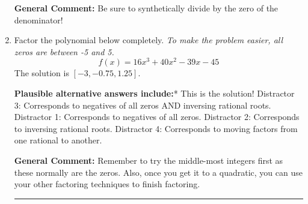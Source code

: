 \documentclass{extbook}[14pt]
\newcommand{\litem}[1]{\item #1

\rule{\textwidth}{0.4pt}}
\begin{document}
\begin{enumerate}
{\textbf{General Comment:} Be sure to synthetically divide by the zero of the denominator!
}
\litem{
Factor the polynomial below completely. \textit{To make the problem easier, all zeros are between -5 and 5.}
\[ f(x) = 16x^{3} +40 x^{2} -39 x -45 \]The solution is \( [-3, -0.75, 1.25] \).\begin{enumerate}[label=\Alph*.]
\textbf{Plausible alternative answers include:}* This is the solution!
 Distractor 3: Corresponds to negatives of all zeros AND inversing rational roots.
 Distractor 1: Corresponds to negatives of all zeros.
 Distractor 2: Corresponds to inversing rational roots.
 Distractor 4: Corresponds to moving factors from one rational to another.
\end{enumerate}

\textbf{General Comment:} Remember to try the middle-most integers first as these normally are the zeros. Also, once you get it to a quadratic, you can use your other factoring techniques to finish factoring.
}
\end{enumerate}
\end{document}
